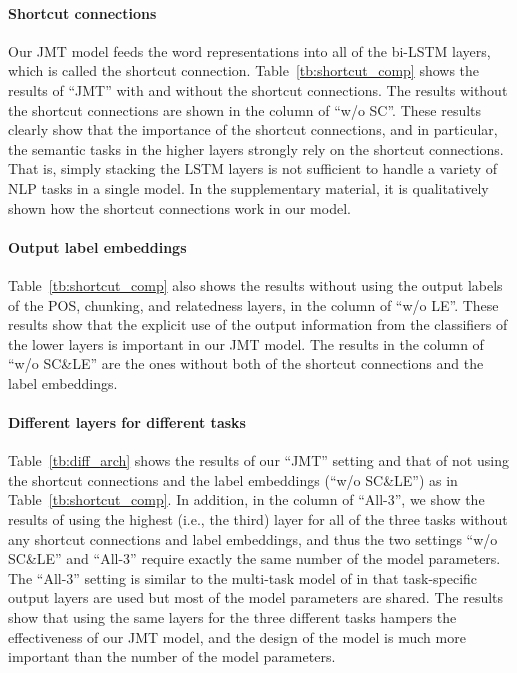 \documentclass[11pt,a4paper]{article}
\begin{document}
\paragraph{Shortcut connections}
Our JMT model feeds the word representations into all of the bi-LSTM layers, which is called the shortcut connection.
Table~\ref{tb:shortcut_comp} shows the results of ``JMT'' with and without the shortcut connections.
The results without the shortcut connections are shown in the column of ``w/o SC''.
These results clearly show that the importance of the shortcut connections, and in particular, the semantic tasks in the higher layers strongly rely on the shortcut connections.
That is, simply stacking the LSTM layers is not sufficient to handle a variety of NLP tasks in a single model.
In the supplementary material, it is qualitatively shown how the shortcut connections work in our model.

\paragraph{Output label embeddings}
Table~\ref{tb:shortcut_comp} also shows the results without using the output labels of the POS, chunking, and relatedness layers, in the column of ``w/o LE''.
These results show that the explicit use of the output information from the classifiers of the lower layers is important in our JMT model.
The results in the column of ``w/o SC\&LE'' are the ones without both of the shortcut connections and the label embeddings.


\paragraph{Different layers for different tasks}
Table~\ref{tb:diff_arch} shows the results of our ``JMT'' setting and that of not using the shortcut connections and the label embeddings (``w/o SC\&LE'') as in Table~\ref{tb:shortcut_comp}.
In addition, in the column of ``All-3'', we show the results of using the highest (i.e., the third) layer for all of the three tasks without any shortcut connections and label embeddings, and thus the two settings ``w/o SC\&LE'' and ``All-3'' require exactly the same number of the model parameters.
The ``All-3'' setting is similar to the multi-task model of \citet{collobert2011senna} in that task-specific output layers are used but most of the model parameters are shared.
The results show that using the same layers for the three different tasks hampers the effectiveness of our JMT model, and the design of the model is much more important than the number of the model parameters.
\end{document}
